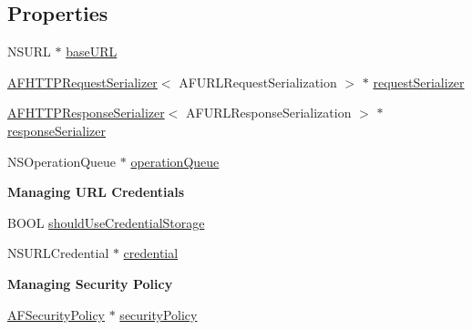 \subsection*{Properties}
\begin{DoxyCompactItemize}
\item 
N\+S\+U\+RL $\ast$ \mbox{\hyperlink{interface_a_f_h_t_t_p_request_operation_manager_a8848451d04825aeb33092f8dffe76edd}{base\+U\+RL}}
\item 
\mbox{\hyperlink{interface_a_f_h_t_t_p_request_serializer}{A\+F\+H\+T\+T\+P\+Request\+Serializer}}$<$ A\+F\+U\+R\+L\+Request\+Serialization $>$ $\ast$ \mbox{\hyperlink{interface_a_f_h_t_t_p_request_operation_manager_a81423c1c26923a95e78139b234506c88}{request\+Serializer}}
\item 
\mbox{\hyperlink{interface_a_f_h_t_t_p_response_serializer}{A\+F\+H\+T\+T\+P\+Response\+Serializer}}$<$ A\+F\+U\+R\+L\+Response\+Serialization $>$ $\ast$ \mbox{\hyperlink{interface_a_f_h_t_t_p_request_operation_manager_a349081285ff4f5b11c474fce0f8345fc}{response\+Serializer}}
\item 
N\+S\+Operation\+Queue $\ast$ \mbox{\hyperlink{interface_a_f_h_t_t_p_request_operation_manager_a9404ca5d0c4b25c98ac256311638b088}{operation\+Queue}}
\end{DoxyCompactItemize}
\begin{Indent}\textbf{ Managing U\+RL Credentials}\par
{\em 

 

 }\begin{DoxyCompactItemize}
\item 
B\+O\+OL \mbox{\hyperlink{interface_a_f_h_t_t_p_request_operation_manager_a9a9619e8520c1842a7aedec71002b81c}{should\+Use\+Credential\+Storage}}
\item 
N\+S\+U\+R\+L\+Credential $\ast$ \mbox{\hyperlink{interface_a_f_h_t_t_p_request_operation_manager_abf6ea79c059fc980923c1cba226e89e8}{credential}}
\end{DoxyCompactItemize}
\end{Indent}
\begin{Indent}\textbf{ Managing Security Policy}\par
{\em 

 

 }\begin{DoxyCompactItemize}
\item 
\mbox{\hyperlink{interface_a_f_security_policy}{A\+F\+Security\+Policy}} $\ast$ \mbox{\hyperlink{interface_a_f_h_t_t_p_request_operation_manager_aa8427c89d6b51ca23e2d00ddeeb8106f}{security\+Policy}}
\end{DoxyCompactItemize}
\end{Indent}
